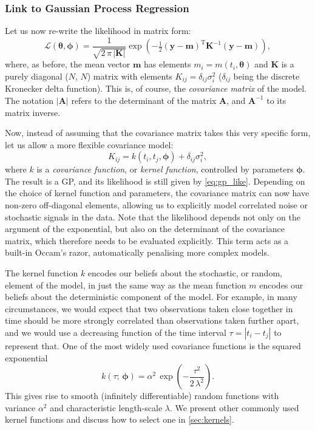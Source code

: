 \documentclass[letterpaper]{ar-1col}
\newcommand{\hyperparams}{\ensuremath{\boldsymbol{\phi}}}
\newcommand{\meanparams}{\ensuremath{\boldsymbol{\theta}}}
\newcommand{\dt}{\ensuremath{\tau}}
\newcommand{\amplitude}{\ensuremath{\alpha}}
\newcommand{\lengthscale}{\ensuremath{\lambda}}
\begin{document}
\subsubsection{Link to Gaussian Process Regression}\label{sec:gp-lsq-link}
Let us now re-write the likelihood in matrix form:
\begin{equation}
\label{eq:gp_like}
  \mathcal{L}(\meanparams,\hyperparams) = 
  \frac{1}{\sqrt{2\,\pi\,|\mathbf{K}|}} \exp \left(-\tfrac{1}{2}(\mathbf{y}-\mathbf{m})^{\mathrm{T}} \mathbf{K}^{-1}
  (\mathbf{y}-\mathbf{m}) \right),
\end{equation}
where, as before, the mean vector $\mathbf{m}$ has elements $m_i=m(t_i,\meanparams)$ and $\mathbf{K}$ is a purely diagonal ($N$, $N$) matrix with elements $K_{ij} = \delta_{ij} \sigma_i^2$ ($\delta_{ij}$ being the discrete Kronecker delta function). This is, of course, the \emph{covariance matrix} of the model. The notation $|\mathbf{A}|$ refers to the determinant of the matrix $\mathbf{A}$, and $\mathbf{A}^{-1}$ to its matrix inverse.

Now, instead of assuming that the covariance matrix takes this very specific form, let us allow a more flexible covariance model:
\begin{equation}
  K_{ij} = k(t_i,t_j,\hyperparams) + \delta_{ij} \sigma_i^2,
\end{equation}
where $k$ is a \emph{covariance function}, or \emph{kernel function}, controlled by parameters $\hyperparams$. The result is a GP, and its likelihood is still given by \autoref{eq:gp_like}. Depending on the choice of kernel function and parameters, the covariance matrix can now have non-zero off-diagonal elements, allowing us to explicitly model correlated noise or stochastic signals in the data.
Note that the likelihood depends not only on the argument of the exponential, but also on the determinant of the covariance matrix, which therefore needs to be evaluated explicitly. This term acts as a built-in Occam's razor, automatically penalising more complex models.

The kernel function $k$ encodes our beliefs about the stochastic, or random, element of the model, in just the same way as the mean function $m$ encodes our beliefs about the deterministic component of the model. For example, in many circumstances, we would expect that two observations taken close together in time should be more strongly correlated than observations taken further apart, and we would use a decreasing function of the time interval $\dt=|t_i-t_j|$ to represent that. One of the most widely used covariance functions is the squared exponential
\begin{equation}
\label{eq:kse}
  k(\dt;\,\hyperparams) = \amplitude^2\,\exp\left(-\frac{\dt^2}{2\,\lengthscale^2}\right).
\end{equation}
This gives rise to smooth (infinitely differentiable) random functions with variance $\amplitude^2$ and characteristic length-scale $\lambda$. We present other commonly used kernel functions and discuss how to select one in \autoref{sec:kernels}.
\end{document}
